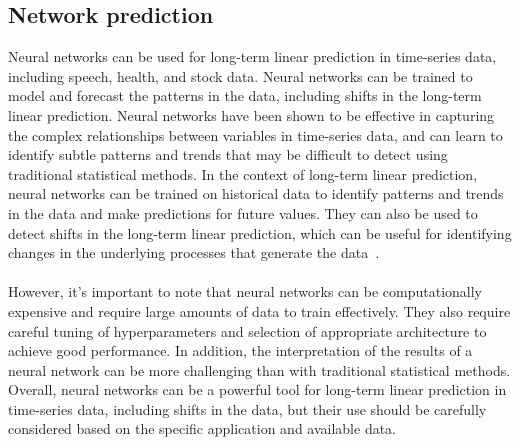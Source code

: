     \subsection{Network prediction} \label{subsec:nnprediction}
    Neural networks can be used for long-term linear prediction in time-series data, including speech, health, and stock data.
    Neural networks can be trained to model and forecast the patterns in the data, including shifts in the long-term linear prediction.
    Neural networks have been shown to be effective in capturing the complex relationships between variables in time-series data,
    and can learn to identify subtle patterns and trends that may be difficult to detect using traditional statistical methods.
    In the context of long-term linear prediction, neural networks can be trained on historical data to identify patterns and trends in the
    data and make predictions for future values. They can also be used to detect shifts in the long-term linear prediction, which can be useful for
    identifying changes in the underlying processes that generate the data~\cite{brownlee2005artificial}.\\
    \\
    However, it's important to note that neural networks can be computationally expensive and require large amounts of data to train effectively. 
    They also require careful tuning of hyperparameters and selection of appropriate architecture to achieve good performance.
    In addition, the interpretation of the results of a neural network can be more challenging than with traditional statistical methods.
    Overall, neural networks can be a powerful tool for long-term linear prediction in time-series data, including shifts in the data,
    but their use should be carefully considered based on the specific application and available data.

